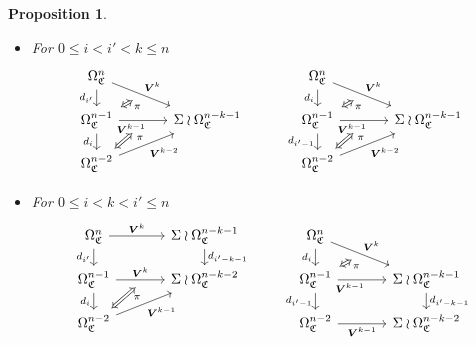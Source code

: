 \documentclass[a4paper,10pt
,draft
]{article}%
\numberwithin{equation}{section}
\numberwithin{figure}{section}
\newtheorem{proposition}[equation]{Proposition}%
\theoremstyle{definition} %
\newcommand{\1}{\ensuremath{\mathbbm 1}}%
\begin{document}
\begin{proposition}
\begin{itemize}
		\item[(FF1)]
		For $0 \leq i < i' < k \leq n$
		\begin{equation}
		\begin{tikzcd}[row sep = 12pt, column sep = 35pt]
		\Omega^n_{\mathfrak{C}}
		\arrow{dr}[swap,name=U]{}{\boldsymbol{V}^k} \arrow{d}[swap]{d_{i'}} &
		&
		\Omega^n_{\mathfrak{C}}
		\arrow{dr}[swap,name=UUU]{}{\boldsymbol{V}^k} \arrow{d}[swap]{d_i} &
		\\
		|[alias=V]|
		\Omega^{n-1}_{\mathfrak{C}} \ar{r}[near start,swap]{\boldsymbol{V}^{k-1}}[swap,name=UU]{} \arrow{d}[swap]{d_i}&
		\Sigma \wr \Omega^{n-k-1}_{\mathfrak{C}}
		&
		|[alias=VVV]|
		\Omega^{n-1}_{\mathfrak{C}} \ar{r}[near start, swap]{\boldsymbol{V}^{k-1}}[swap,name=UUUU]{} \ar{d}[swap]{d_{i'-1}} &
		\Sigma \wr \Omega^{n-k-1}_{\mathfrak{C}}
		\\
		|[alias=VV]|
		\Omega^{n-2}_{\mathfrak{C}} \arrow{ur}[swap]{\boldsymbol{V}^{k-2}} &
		&
		|[alias=VVVV]|
		\Omega^{n-2}_{\mathfrak{C}} \arrow{ur}[swap]{\boldsymbol{V}^{k-2}} &
		\arrow[Leftrightarrow, from=V, to=U,shorten >=0.05cm,shorten <=0.05cm
		,swap,near end,"\pi"
		]
		\arrow[Leftrightarrow, from=VV, to=UU,shorten >=0.25cm,shorten <=0.05cm
		,swap,near end,"\pi"
		]
		\arrow[Leftrightarrow, from=VVV, to=UUU,shorten >=0.05cm,shorten <=0.05cm
		,swap,near end,"\pi"
		]
		\arrow[Leftrightarrow, from=VVVV, to=UUUU,shorten >=0.25cm,shorten <=0.05cm
		,swap,near end,"\pi"
		]
		\end{tikzcd}
		\end{equation}
		
		\item[(FF2)]
		For $0 \leq i < k < i' \leq n$
		\begin{equation}
		\begin{tikzcd}[row sep = 12pt, column sep = 35pt]
		\Omega^n_{\mathfrak{C}}
		\arrow{r}[swap,name=U]{}{\boldsymbol{V}^k} \arrow{d}[swap]{d_{i'}} &
		\Sigma \wr \Omega^{n-k-1}_{\mathfrak{C}} \ar{d}{d_{i'-k-1}}
		&
		\Omega^n_{\mathfrak{C}}
		\arrow{dr}[swap,name=UUU]{}{\boldsymbol{V}^k} \arrow{d}[swap]{d_i} &
		\\
		|[alias=V]|
		\Omega^{n-1}_{\mathfrak{C}} \ar{r}{\boldsymbol{V}^{k}}[swap,name=UU]{} \arrow{d}[swap]{d_i}&
		\Sigma \wr \Omega^{n-k-2}_{\mathfrak{C}}
		&
		|[alias=VVV]|
		\Omega^{n-1}_{\mathfrak{C}} \ar{r}[near start, swap]{\boldsymbol{V}^{k-1}}[swap,name=UUUU]{} \ar{d}[swap]{d_{i'-1}} &
		\Sigma \wr \Omega^{n-k-1}_{\mathfrak{C}} \ar{d}{d_{i'-k-1}}
		\\
		|[alias=VV]|
		\Omega^{n-2}_{\mathfrak{C}} \arrow{ur}[swap]{\boldsymbol{V}^{k-1}} &
		&
		|[alias=VVVV]|
		\Omega^{n-2}_{\mathfrak{C}} \ar{r}[swap]{\boldsymbol{V}^{k-1}} &
		\Sigma \wr \Omega^{n-k-2}_{\mathfrak{C}}
		\arrow[Leftrightarrow, from=VV, to=UU,shorten >=0.05cm,shorten <=0.05cm
		,swap,near end,"\pi"
		]
		\arrow[Leftrightarrow, from=VVV, to=UUU,shorten >=0.05cm,shorten <=0.05cm
		,swap,near end,"\pi"
		]
		\end{tikzcd}
		\end{equation}
		

\end{itemize}
\end{proposition}
\end{document}
